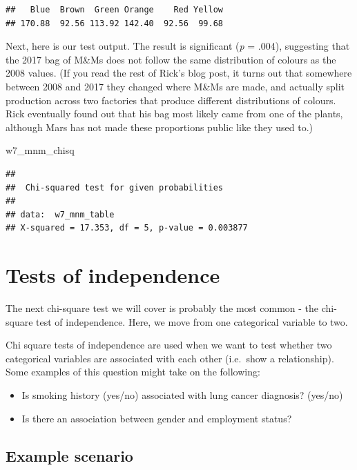 \documentclass[
]{book}
\newenvironment{Shaded}{\begin{snugshade}}{\end{snugshade}}
\newcommand{\NormalTok}[1]{#1}
\providecommand{\tightlist}{%
  \setlength{\itemsep}{0pt}\setlength{\parskip}{0pt}}
\begin{document}
\begin{verbatim}
##   Blue  Brown  Green Orange    Red Yellow 
## 170.88  92.56 113.92 142.40  92.56  99.68
\end{verbatim}

Next, here is our test output. The result is significant (\emph{p} = .004), suggesting that the 2017 bag of M\&Ms does not follow the same distribution of colours as the 2008 values. (If you read the rest of Rick's blog post, it turns out that somewhere between 2008 and 2017 they changed where M\&Ms are made, and actually split production across two factories that produce different distributions of colours. Rick eventually found out that his bag most likely came from one of the plants, although Mars has not made these proportions public like they used to.)

\begin{Shaded}
\begin{Highlighting}[]
\NormalTok{w7\_mnm\_chisq}
\end{Highlighting}
\end{Shaded}

\begin{verbatim}
## 
##  Chi-squared test for given probabilities
## 
## data:  w7_mnm_table
## X-squared = 17.353, df = 5, p-value = 0.003877
\end{verbatim}

\hypertarget{tests-of-independence}{%
\section{Tests of independence}\label{tests-of-independence}}

The next chi-square test we will cover is probably the most common - the chi-square test of independence. Here, we move from one categorical variable to two.

Chi square tests of independence are used when we want to test whether two categorical variables are associated with each other (i.e.~show a relationship). Some examples of this question might take on the following:

\begin{itemize}
\tightlist
\item
  Is smoking history (yes/no) associated with lung cancer diagnosis? (yes/no)
\item
  Is there an association between gender and employment status?
\end{itemize}

\hypertarget{example-scenario}{%
\subsection{Example scenario}\label{example-scenario}}
\end{document}
